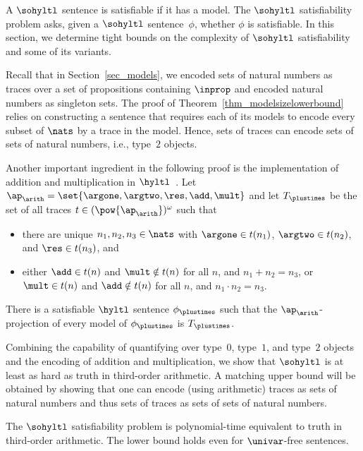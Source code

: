 A $\sohyltl$ sentence is satisfiable if it has a model. The $\sohyltl$ satisfiability problem asks, given a $\sohyltl$ sentence~$\phi$, whether $\phi$ is satisfiable. In this section, we determine tight bounds on the complexity of $\sohyltl$ satisfiability and some of its variants.

Recall that in Section~\ref{sec_models}, we encoded sets of natural numbers as traces over a set of propositions containing $\inprop$ and encoded natural numbers as singleton sets.
The proof of Theorem~\ref{thm_modelsizelowerbound} relies on constructing a sentence that requires each of its models to encode every subset of $\nats$ by a trace in the model. 
Hence, sets of traces can encode sets of sets of natural numbers, i.e., type~$2$ objects. 

Another important ingredient in the following proof is the implementation of addition and multiplication in $\hyltl$~\cite{hyperltlsat}.
Let $\ap_\arith = \set{\argone, \argtwo, \res, \add, \mult}$ and let $T_\plustimes$ be the set of all traces $t \in (\pow{\ap_\arith})^\omega$ such that
\begin{itemize}

    \item there are unique $n_1, n_2, n_3 \in \nats$  with $\argone \in t(n_1)$, $\argtwo \in t(n_2)$, and $\res \in t(n_3)$, and

    \item either $\add \in t(n)$ and $\mult \notin t(n)$ for all $n$, and $n_1+n_2 = n_3$, or $\mult \in t(n)$ and $\add \notin t(n)$ for all $n$, and $n_1 \cdot n_2 = n_3$.

\end{itemize}

\begin{prop}
\label{prop_plustimesinhyperltl}
There is a satisfiable $\hyltl$ sentence $\phi_\plustimes$ such that the $\ap_\arith$-projection of every model of $\phi_\plustimes$ is $T_\plustimes$.
\end{prop}

Combining the capability of quantifying over type~$0$, type~$1$, and type~$2$ objects and the encoding of addition and multiplication, we show that $\sohyltl$ is at least as hard as truth in third-order arithmetic.
A matching upper bound will be obtained by showing that one can encode (using arithmetic) traces as sets of natural numbers and thus sets of traces as sets of sets of natural numbers. 

\begin{thm}
\label{thm_satcomplexity}
The $\sohyltl$ satisfiability problem is polynomial-time equivalent to truth in third-order arithmetic. The lower bound holds even for $\univar$-free sentences.
\end{thm}

